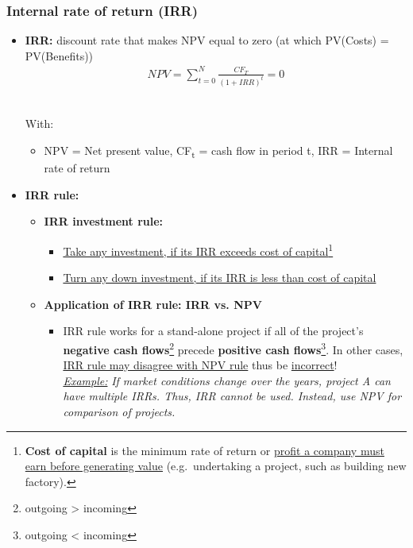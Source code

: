 \documentclass[ieeetran]{article}
\begin{document}
\subsubsection{Internal rate of return (IRR)} %
\label{ssub:internal_rate_of_return_iRR_}
\begin{itemize}
  \item \textbf{IRR:} discount rate that makes NPV equal to zero (at which PV(Costs) = PV(Benefits))
	  \large
	  \begin{equation*}
	  \boxed{
	  \begin{aligned}
	  NPV = \sum_{t=0}^{N} \frac{CF_T}{(1+IRR)^t} = 0  
	  \end{aligned}
	  }
	  \end{equation*}
	  \\
	  \normalsize

	  With:
	  \begin{itemize}
	    \item NPV = Net present value, CF\textsubscript{t} = cash flow in period t,
		    IRR = Internal rate of return
	  \end{itemize}

\item \textbf{IRR rule:}
	\begin{itemize}
	  \item \textbf{IRR investment rule:}
		  \begin{itemize}
			  \item \underline{Take any investment, if its IRR exceeds cost of capital}\footnote{\textbf{Cost of capital} is the minimum rate of return or \underline{profit a company must earn before generating value} (e.g.\ undertaking a project, such as building new factory).}
			\item \underline{Turn any down investment, if its IRR is less than cost of capital}
		  \end{itemize}
	  \item \textbf{Application of IRR rule: IRR vs. NPV}
		  \begin{itemize}
			  \item IRR rule works for a stand-alone project if all of the project's \textbf{negative cash flows}\footnote{outgoing > incoming} precede \textbf{positive cash flows}\footnote{outgoing < incoming}. In other cases, \underline{IRR rule may disagree with NPV rule} thus be \underline{incorrect}!\\ 

			 \underline{\textit{Example:}}  \textit{If market conditions change over the years, project A can have multiple IRRs. Thus, IRR cannot be used. Instead, use NPV for comparison of projects.}
	

\end{itemize}
\end{itemize}
\end{itemize}
\end{document}
